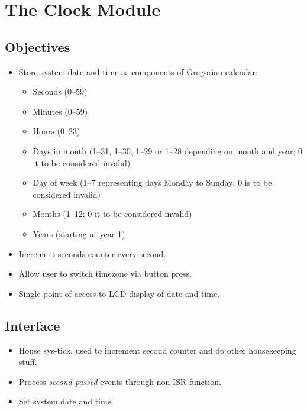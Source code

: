 \chapter{The Clock Module}

\section{Objectives}

\begin{itemize}
    \item Store system date and time as components of Gregorian calendar:
          \begin{itemize}
              \item Seconds (\numrange{0}{59})
              \item Minutes (\numrange{0}{59})
              \item Hours (\numrange{0}{23})
              \item Days in month (\numrange{1}{31}, \numrange{1}{30}, \numrange{1}{29} or \numrange{1}{28} depending on month and year; \num{0} it to be considered invalid)
              \item Day of week (\numrange{1}{7} representing days Monday to Sunday; \num{0} is to be considered invalid)
              \item Months (\numrange{1}{12}; \num{0} it to be considered invalid)
              \item Years (starting at year \num{1})
          \end{itemize}
    \item Increment seconds counter every second.
    \item Allow user to switch timezone via button press.
    \item Single point of access to LCD display of date and time.
\end{itemize}

\section{Interface}

\begin{itemize}
    \item House sys-tick, used to increment second counter and do other housekeeping stuff.
    \item Process \emph{second passed} events through non-ISR function.
    \item Set system date and time.
\end{itemize}

